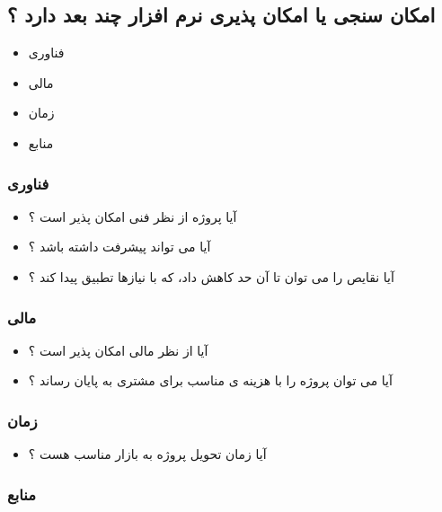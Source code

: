 \documentclass{article}
\begin{document}
\subsection{امکان سنجی یا امکان پذیری نرم افزار چند بعد دارد ؟}

\begin{itemize}
	\item فناوری
	\item مالی
	\item زمان
	\item منابع
\end{itemize}



\subsubsection{فناوری}


\begin{itemize}
	\item آیا پروژه از نظر فنی امکان پذیر است ؟
	\item آیا می تواند پیشرفت داشته باشد ؟
	\item آیا نقایص را می توان تا آن حد کاهش داد، که با نیازها تطبیق پیدا کند ؟
\end{itemize}



\subsubsection{مالی}


\begin{itemize}
	\item آیا از نظر مالی امکان پذیر است ؟
	\item آیا می توان پروژه را با هزینه ی مناسب  برای مشتری به پایان رساند ؟
\end{itemize}


\subsubsection{زمان}


\begin{itemize}
	\item آیا زمان تحویل پروژه به بازار مناسب هست ؟
\end{itemize}


\subsubsection{منابع}
\end{document}
